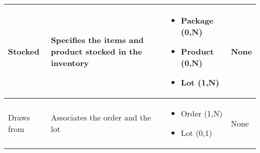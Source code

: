 \begin{longtable}{|p{}|p{} |p{}|p{} |}
Stocked  & Specifies the items and product stocked in the inventory & \begin{itemize}
	\vspace{-1em}
	\item Package (0,N)
	\item Product (0,N)
	\item Lot (1,N)
\end{itemize}
&  None \\\hline


Draws from & Associates the order and the lot & \begin{itemize}
	\vspace{-1em}
	\item Order (1,N)
	\item Lot (0,1)
\end{itemize}
&  None \\\hline

\end{longtable}